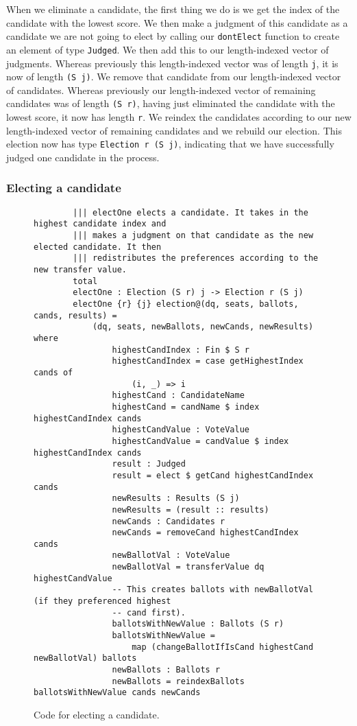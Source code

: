 When we eliminate a candidate, the first thing we do is we get the index of the
candidate with the lowest score. We then make a judgment of this candidate as a
candidate we are not going to elect by calling our \texttt{dontElect} function
to create an element of type \texttt{Judged}. We then add this to our
length-indexed vector of judgments. Whereas previously this length-indexed
vector was of length \texttt{j}, it is now of length \texttt{(S j)}. We remove that
candidate from our length-indexed vector of candidates. Whereas previously our
length-indexed vector of remaining candidates was of length \texttt{(S r)},
having just eliminated the candidate with the lowest score, it now has length
\texttt{r}. We reindex the candidates according to our new length-indexed vector
of remaining candidates and we rebuild our election. This election now has type
\texttt{Election r (S j)}, indicating that we have successfully judged one
candidate in the process. 

\subsubsection{Electing a candidate}

\begin{figure}[ht!!!!!!!!]
	\caption{Code for electing a candidate.}
	\label{elect_cand_code}
    \begin{lstlisting}
        ||| electOne elects a candidate. It takes in the highest candidate index and
        ||| makes a judgment on that candidate as the new elected candidate. It then
        ||| redistributes the preferences according to the new transfer value. 
        total
        electOne : Election (S r) j -> Election r (S j)
        electOne {r} {j} election@(dq, seats, ballots, cands, results) = 
            (dq, seats, newBallots, newCands, newResults) where
                highestCandIndex : Fin $ S r
                highestCandIndex = case getHighestIndex cands of
                    (i, _) => i
                highestCand : CandidateName
                highestCand = candName $ index highestCandIndex cands
                highestCandValue : VoteValue
                highestCandValue = candValue $ index highestCandIndex cands
                result : Judged
                result = elect $ getCand highestCandIndex cands
                newResults : Results (S j)
                newResults = (result :: results)
                newCands : Candidates r
                newCands = removeCand highestCandIndex cands
                newBallotVal : VoteValue
                newBallotVal = transferValue dq highestCandValue
                -- This creates ballots with newBallotVal (if they preferenced highest
                -- cand first). 
                ballotsWithNewValue : Ballots (S r)
                ballotsWithNewValue = 
                    map (changeBallotIfIsCand highestCand newBallotVal) ballots
                newBallots : Ballots r
                newBallots = reindexBallots ballotsWithNewValue cands newCands
    \end{lstlisting}
\end{figure}

